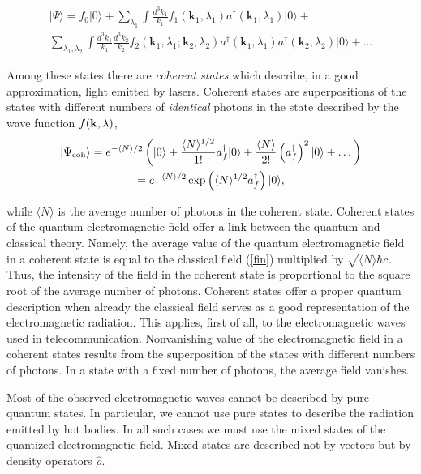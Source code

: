 \documentclass[onecolumn,aps,pra,12pt]{revtex4-1}
\begin{document}
\begin{widetext}
\begin{multline}\label{gen}
|\Psi\rangle=f_0|0\rangle+\sum_{\lambda_1}\int\frac{d^3k_1}{k_1}f_1({\bm k}_1,\lambda_1)a^\dagger({\bm k}_1,\lambda_1)|0\rangle+\\
\sum_{\lambda_1,\lambda_2}\int\frac{d^3k_1}{k_1}\frac{d^3k_2}{k_2}f_2({\bm k}_1,\lambda_1;{\bm k}_2,\lambda_2)a^\dagger({\bm k}_1,\lambda_1)a^\dagger({\bm k}_2,\lambda_2)|0\rangle+\dots
\end{multline}

Among these states there are {\em coherent states} \cite{roy,ss} which describe, in a good approximation, light emitted by lasers. Coherent states are superpositions of the states with different numbers of {\em identical} photons in the state described by the wave function $f({\bf k},\lambda)$,
\begin{multline}\label{coh}
|\Psi_{\rm coh}\rangle=e^{-\langle N\rangle/2}\left(|0\rangle+\frac{\langle N\rangle^{1/2}}{1!}a^\dagger_f|0\rangle
+\frac{\langle N\rangle}{2!}\left(a^\dagger_f\right)^2|0\rangle+\dots\right)\\
=e^{-\langle N\rangle/2}\exp\left(\langle N\rangle^{1/2}a^\dagger_f\right)|0\rangle,
\end{multline}
\end{widetext}
while $\langle N\rangle$ is the average number of photons in the coherent state. Coherent states of the quantum electromagnetic field offer a link between the quantum and classical theory. Namely, the average value of the quantum electromagnetic field in a coherent state is equal to the classical field (\ref{fin}) multiplied by $\sqrt{\langle N\rangle\hbar c}$. Thus, the intensity of the field in the coherent state is proportional to the square root of the average number of photons. Coherent states offer a proper quantum description when already the classical field serves as a good representation of the electromagnetic radiation. This applies, first of all, to the electromagnetic waves used in telecommunication. Nonvanishing value of the electromagnetic field in a coherent states results from the superposition of the states with different numbers of photons. In a state with a fixed number of photons, the average field vanishes.

Most of the observed electromagnetic waves cannot be described by pure quantum states. In particular, we cannot use pure states to describe the radiation emitted by hot bodies. In all such cases we must use the mixed states of the quantized electromagnetic field. Mixed states \cite{schiff} are described not by vectors but by density operators $\hat\rho$.
\end{document}
